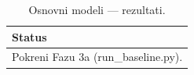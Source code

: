 \begin{table}[H]\centering
\caption{Osnovni modeli --- rezultati.}\label{tab:baseline}
\begin{tabular}{l}
\toprule
Status \\
\midrule
Pokreni Fazu 3a (run\_baseline.py). \\
\bottomrule
\end{tabular}
\end{table}
